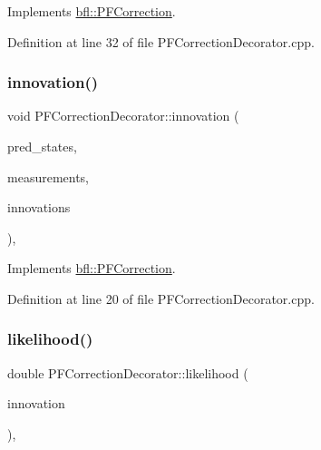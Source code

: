 Implements \mbox{\hyperlink{classbfl_1_1PFCorrection_a3bc4010f306825d69014bee53cd262ad}{bfl\+::\+P\+F\+Correction}}.



Definition at line 32 of file P\+F\+Correction\+Decorator.\+cpp.

\mbox{\label{classbfl_1_1PFCorrectionDecorator_ac468b6ca9f6991217b6771173c253b42}} 
\subsubsection{\texorpdfstring{innovation()}{innovation()}}
{\footnotesize\ttfamily void P\+F\+Correction\+Decorator\+::innovation (\begin{DoxyParamCaption}\item[{const Eigen\+::\+Ref$<$ const Eigen\+::\+Matrix\+Xf $>$ \&}]{pred\+\_\+states,  }\item[{const Eigen\+::\+Ref$<$ const Eigen\+::\+Matrix\+Xf $>$ \&}]{measurements,  }\item[{Eigen\+::\+Ref$<$ Eigen\+::\+Matrix\+Xf $>$}]{innovations }\end{DoxyParamCaption})\hspace{0.3cm}{\ttfamily [override]}, {\ttfamily [virtual]}}



Implements \mbox{\hyperlink{classbfl_1_1PFCorrection_a22e803c147f8fb45b7b98c854a947057}{bfl\+::\+P\+F\+Correction}}.



Definition at line 20 of file P\+F\+Correction\+Decorator.\+cpp.

\mbox{\label{classbfl_1_1PFCorrectionDecorator_a39c3201dbd0821427b684228451faea5}} 
\subsubsection{\texorpdfstring{likelihood()}{likelihood()}}
{\footnotesize\ttfamily double P\+F\+Correction\+Decorator\+::likelihood (\begin{DoxyParamCaption}\item[{const Eigen\+::\+Ref$<$ const Eigen\+::\+Vector\+Xf $>$ \&}]{innovation }\end{DoxyParamCaption})\hspace{0.3cm}{\ttfamily [override]}, {\ttfamily [virtual]}}



